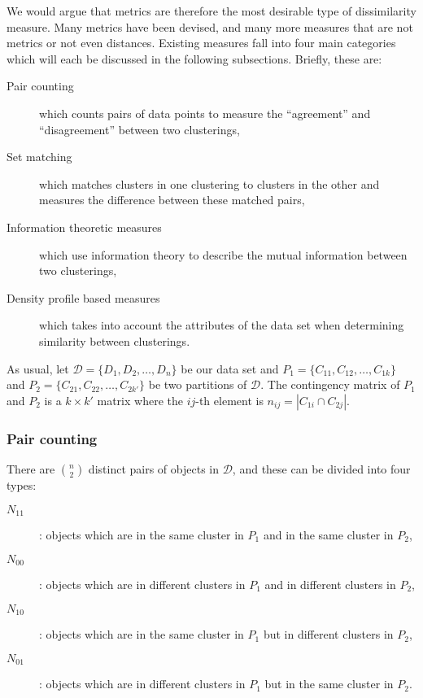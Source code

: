 \documentclass[a4paper]{report}
\begin{document}
We would argue that metrics are therefore the most desirable type of
dissimilarity measure.  Many metrics have been devised, and many more measures
that are not metrics or not even distances.  Existing measures fall into four
main categories which will each be discussed in the following subsections.
Briefly, these are:
\begin{description}
\item[Pair counting] which counts pairs of data points to measure the
  ``agreement'' and ``disagreement'' between two clusterings,
\item[Set matching] which matches clusters in one clustering to clusters in
  the other and measures the difference between these matched pairs,
\item[Information theoretic measures] which use information theory to
  describe the mutual information between two clusterings,
\item[Density profile based measures] which takes into account the attributes
  of the data set when determining similarity between clusterings.
\end{description}

As usual, let $\mathcal{D} = \{D_1,D_2,\dotsc,D_n\}$ be our data set and $P_1
= \{C_{11},C_{12},\dotsc,C_{1k}\}$ and $P_2 =
\{C_{21},C_{22},\dotsc,C_{2k'}\}$ be two partitions of $\mathcal{D}$.  The
contingency matrix of $P_1$ and $P_2$ is a $k \times k'$ matrix where the
$ij$-th element is $n_{ij} = |C_{1i} \cap C_{2j}|$.

\subsubsection{Pair counting}
\label{sec:pair-counting}

There are $\binom{n}{2}$ distinct pairs of objects in $\mathcal{D}$, and these
can be divided into four types:
\begin{description}
\item[$N_{11}$]: objects which are in the same cluster in $P_1$ and in the
  same cluster in $P_2$,
\item[$N_{00}$]: objects which are in different clusters in $P_1$ and in
  different clusters in $P_2$,
\item[$N_{10}$]: objects which are in the same cluster in $P_1$ but in
  different clusters in $P_2$,
\item[$N_{01}$]: objects which are in different clusters in $P_1$ but in the
  same cluster in $P_2$.
\end{description}
\end{document}
